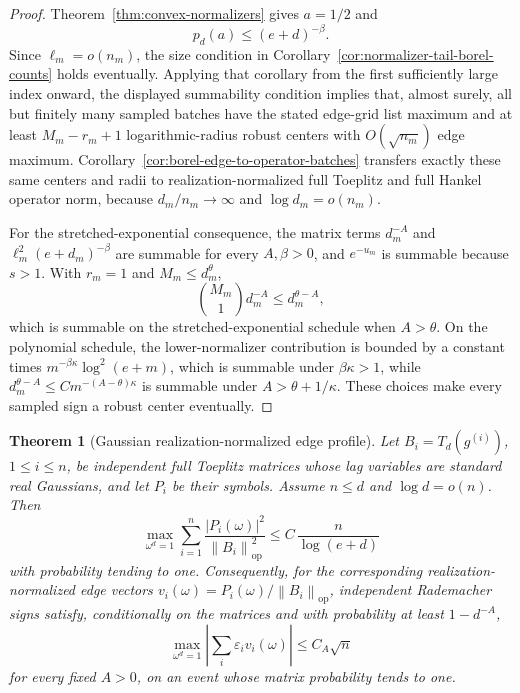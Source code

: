 \documentclass[11pt]{amsart}
\numberwithin{equation}{section}
\newtheorem{theorem}{Theorem}[section]
\theoremstyle{definition}
\theoremstyle{remark}
\newcommand{\op}{\mathrm{op}}
\newcommand{\norm}[1]{\left\lVert #1\right\rVert}
\newcommand{\abs}[1]{\left\lvert #1\right\rvert}
\newcommand{\eps}{\varepsilon}
\begin{document}
\begin{proof}
Theorem~\ref{thm:convex-normalizers} gives \(a=1/2\) and
\[
  p_d(a)\le (e+d)^{-\beta}.
\]
Since \(\ell_m=o(n_m)\), the size condition in
Corollary~\ref{cor:normalizer-tail-borel-counts} holds eventually.  Applying
that corollary from the first sufficiently large index onward, the displayed
summability condition implies that, almost surely, all but finitely many sampled
batches have the stated edge-grid list maximum and at least \(M_m-r_m+1\)
logarithmic-radius robust centers with \(O(\sqrt{n_m})\) edge maximum.
Corollary~\ref{cor:borel-edge-to-operator-batches} transfers exactly these same
centers and radii to realization-normalized full Toeplitz and full Hankel
operator norm, because \(d_m/n_m\to\infty\) and \(\log d_m=o(n_m)\).

For the stretched-exponential consequence, the matrix terms
\(d_m^{-A}\) and \(\ell_m^2(e+d_m)^{-\beta}\) are summable for every
\(A,\beta>0\), and \(e^{-u_m}\) is summable because \(s>1\).  With
\(r_m=1\) and \(M_m\le d_m^\theta\),
\[
  \binom{M_m}{1}d_m^{-A}\le d_m^{\theta-A},
\]
which is summable on the stretched-exponential schedule when \(A>\theta\).  On
the polynomial schedule, the lower-normalizer contribution is bounded by a
constant times \(m^{-\beta\kappa}\log^2(e+m)\), which is summable under
\(\beta\kappa>1\), while \(d_m^{\theta-A}\le C m^{-(A-\theta)\kappa}\) is
summable under \(A>\theta+1/\kappa\).  These choices make every sampled sign a
robust center eventually.
\end{proof}

\begin{theorem}[Gaussian realization-normalized edge profile]
\label{thm:gaussian-realized-profile}
Let \(B_i=T_d(g^{(i)})\), \(1\le i\le n\), be independent full Toeplitz
matrices whose lag variables are standard real Gaussians, and let \(P_i\) be
their symbols.  Assume \(n\le d\) and \(\log d=o(n)\).  Then
\[
  \max_{\omega^d=1}
  \sum_{i=1}^n
  \frac{\abs{P_i(\omega)}^2}{\norm{B_i}_{\op}^2}
  \le C\,\frac{n}{\log(e+d)}
\]
with probability tending to one.  Consequently, for the corresponding
realization-normalized edge vectors \(v_i(\omega)=P_i(\omega)/\norm{B_i}_{\op}\),
independent Rademacher signs satisfy, conditionally on the matrices and with
probability at least \(1-d^{-A}\),
\[
  \max_{\omega^d=1}\abs{\sum_i\eps_i v_i(\omega)}
  \le C_A\sqrt n
\]
for every fixed \(A>0\), on an event whose matrix probability tends to one.
\end{theorem}
\end{document}
